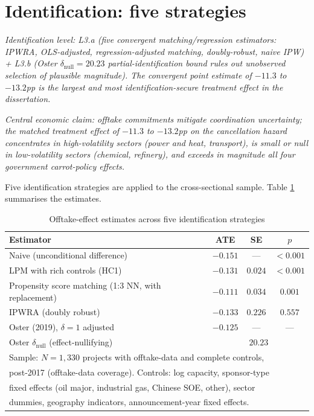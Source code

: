 \section{Identification: five strategies}
\noindent\emph{Identification level: L3.a (five convergent matching/regression estimators: IPWRA, OLS-adjusted, regression-adjusted matching, doubly-robust, naive IPW) + L3.b (Oster $\delta_{\text{null}} = 20.23$ partial-identification bound rules out unobserved selection of plausible magnitude). The convergent point estimate of $-11.3$ to $-13.2$pp is the largest and most identification-secure treatment effect in the dissertation.}

\noindent\emph{Central economic claim: offtake commitments mitigate coordination uncertainty; the matched treatment effect of $-11.3$ to $-13.2$pp on the cancellation hazard concentrates in high-volatility sectors (power and heat, transport), is small or null in low-volatility sectors (chemical, refinery), and exceeds in magnitude all four government carrot-policy effects.}

\label{sec:offtake_id}

Five identification strategies are applied to the cross-sectional sample. Table \ref{tab:offtake_main} summarises the estimates.

\begin{table}[h]
\centering
\caption{Offtake-effect estimates across five identification strategies}
\label{tab:offtake_main}
\begin{tabular}{lccc}
\toprule
Estimator & ATE & SE & $p$ \\
\midrule
Naive (unconditional difference) & $-0.151$ & --- & $<0.001$ \\
LPM with rich controls (HC1)     & $-0.131$ & $0.024$ & $<0.001$ \\
Propensity score matching (1:3 NN, with replacement) & $-0.111$ & $0.034$ & $0.001$ \\
IPWRA (doubly robust) & $-0.133$ & $0.226$ & $0.557$ \\
Oster (2019), $\delta = 1$ adjusted & $-0.125$ & --- & --- \\
\midrule
Oster $\delta_{\text{null}}$ (effect-nullifying) & \multicolumn{3}{c}{$\mathbf{20.23}$} \\
\bottomrule
\multicolumn{4}{l}{\footnotesize Sample: $N = 1{,}330$ projects with offtake-data and complete controls,} \\
\multicolumn{4}{l}{\footnotesize post-2017 (offtake-data coverage). Controls: log capacity, sponsor-type} \\
\multicolumn{4}{l}{\footnotesize fixed effects (oil major, industrial gas, Chinese SOE, other), sector} \\
\multicolumn{4}{l}{\footnotesize dummies, geography indicators, announcement-year fixed effects.} \\
\end{tabular}
\end{table}

